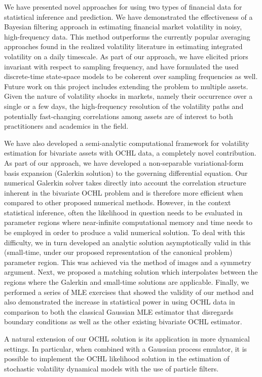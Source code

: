 \label{ch:conclusion}

We have presented novel approaches for using two types of financial
data for statistical inference and prediction. We have demonstrated
the effectiveness of a Bayesian filtering approach in estimating
financial market volatility in noisy, high-frequency data. This method
outperforms the currently popular averaging approaches found in the
realized volatility literature in estimating integrated volatility on
a daily timescale. As part of our approach, we have elicited priors
invariant with respect to sampling frequency, and have formulated the
used discrete-time state-space models to be coherent over sampling
frequencies as well. Future work on this project includes extending
the problem to multiple assets. Given the nature of volatility shocks
in markets, namely their occurrence over a single or a few days, the
high-frequency resolution of the volatility paths and potentially
fast-changing correlations among assets are of interest to both
practitioners and academics in the field.

We have also developed a semi-analytic computational framework for
volatility estimation for bivariate assets with OCHL data, a
completely novel contribution. As part of our approach, we have
developed a non-separable variational-form basis expansion (Galerkin
solution) to the governing differential equation. Our numerical
Galerkin solver takes directly into account the correlation structure
inherent in the bivariate OCHL problem and is therefore more efficient
when compared to other proposed numerical methods. However, in the
context statistical inference, often the likelihood in question needs
to be evaluated in parameter regions where near-infinite computational
memory and time needs to be employed in order to produce a valid
numerical solution. To deal with this difficulty, we in turn developed
an analytic solution asymptotically valid in this (small-time, under
our proposed representation of the canonical problem) parameter
region. This was achieved via the method of images and a symmetry
argument. Next, we proposed a matching solution which interpolates
between the regions where the Galerkin and small-time solutions are
applicable. Finally, we performed a series of MLE exercises that
showed the validity of our method and also demonstrated the increase
in statistical power in using OCHL data in comparison to both the
classical Gaussian MLE estimator that disregards boundary conditions as
well as the other existing bivariate OCHL estimator.

A natural extension of our OCHL solution is its application in more
dynamical settings. In particular, when combined with a Gaussian
process emulator, it is possible to implement the OCHL likelihood
solution in the estimation of stochastic volatility dynamical models
with the use of particle filters.
